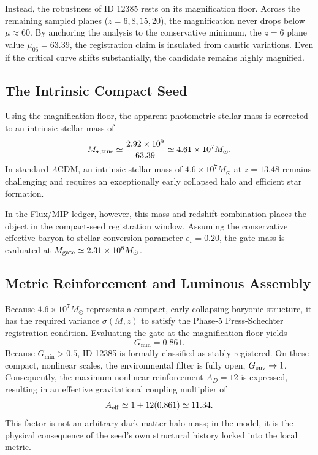 \documentclass[11pt,a4paper]{article}
\newcommand{\LCDM}{$\Lambda$CDM}
\newcommand{\Msun}{M_\odot}
\begin{document}
Instead, the robustness of ID 12385 rests on its magnification floor. Across the remaining sampled planes ($z=6,8,15,20$), the magnification never drops below $\mu\approx60$. By anchoring the analysis to the conservative minimum, the $z=6$ plane value $\mu_{06}=63.39$, the registration claim is insulated from caustic variations. Even if the critical curve shifts substantially, the candidate remains highly magnified.

\subsection{The Intrinsic Compact Seed}

Using the magnification floor, the apparent photometric stellar mass is corrected to an intrinsic stellar mass of
\begin{equation}
M_{\star,\rm true}\simeq\frac{2.92\times10^9}{63.39}\simeq4.61\times10^7\Msun.
\end{equation}
In standard \LCDM, an intrinsic stellar mass of $4.6\times10^7\Msun$ at $z=13.48$ remains challenging and requires an exceptionally early collapsed halo and efficient star formation.

In the Flux/MIP ledger, however, this mass and redshift combination places the object in the compact-seed registration window. Assuming the conservative effective baryon-to-stellar conversion parameter $\epsilon_\star=0.20$, the gate mass is evaluated at $M_{\rm gate}\simeq2.31\times10^8\Msun$.

\subsection{Metric Reinforcement and Luminous Assembly}

Because $4.6\times10^7\Msun$ represents a compact, early-collapsing baryonic structure, it has the required variance $\sigma(M,z)$ to satisfy the Phase-5 Press-Schechter registration condition. Evaluating the gate at the magnification floor yields
\begin{equation}
G_{\min}=0.861.
\end{equation}
Because $G_{\min}>0.5$, ID 12385 is formally classified as stably registered. On these compact, nonlinear scales, the environmental filter is fully open, $G_{\rm env}\rightarrow1$. Consequently, the maximum nonlinear reinforcement $A_D=12$ is expressed, resulting in an effective gravitational coupling multiplier of
\begin{equation}
A_{\rm eff}\simeq1+12(0.861)\simeq11.34.
\end{equation}
This factor is not an arbitrary dark matter halo mass; in the model, it is the physical consequence of the seed's own structural history locked into the local metric.
\end{document}
